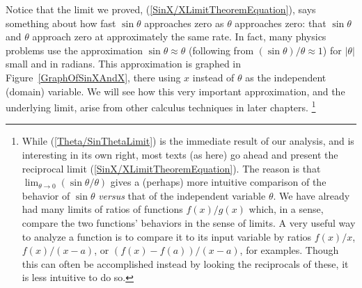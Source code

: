 Notice that the limit we proved, (\ref{SinX/XLimitTheoremEquation}),
says something about how fast $\sin \theta$ approaches zero
as $\theta$ approaches zero: that $\sin \theta$ and $\theta$ approach
zero at approximately the same rate.  In fact, many
physics problems use the approximation $\sin\theta\approx\theta$
(following from $(\sin\theta)/\theta\approx 1$)
for $|\theta|$ small and in radians.  This  approximation  is graphed
in Figure~\ref{GraphOfSinXAndX}, there using $x$ instead
of $\theta$ as the independent (domain) variable. We will see how this 
very important approximation, and the underlying limit,
arise from other calculus techniques
in later chapters.%
\footnote{%
While (\ref{Theta/SinThetaLimit}) is the immediate result of our
analysis, and is interesting in its own right,
most texts (as here) go ahead and present the reciprocal
limit (\ref{SinX/XLimitTheoremEquation}).  The reason
is that $\lim_{\theta\to0}(\sin\theta/\theta)$ 
gives a (perhaps) more intuitive comparison of the behavior
of $\sin\theta$ {\it versus} that of the independent variable
$\theta$.  We have already had many limits of ratios of 
functions $f(x)/g(x)$ which, in a sense, compare the two
functions' behaviors in the sense of limits.  A very
useful way to analyze a function is to compare it to its
input variable by  ratios $f(x)/x$,  $f(x)/(x-a)$, or
$(f(x)-f(a))/(x-a)$, 
for examples.  Though
this can often be accomplished instead by looking the
reciprocals of these, it is less intuitive to do so.
}
